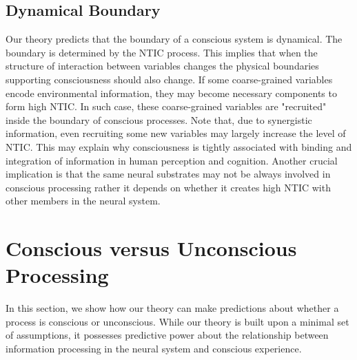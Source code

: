 \documentclass[utf8]{article}
\begin{document}
        
		\begin{figure}[H]
		
			\label{fig:hierarchy}
		\end{figure}


        \subsection{Dynamical Boundary}
        Our theory predicts that the boundary of a conscious system is dynamical. The boundary is determined by the NTIC process. This implies that when the structure of interaction between variables changes the physical boundaries supporting consciousness should also change. If some coarse-grained variables encode environmental information, they may become necessary components to form high NTIC. In such case, these coarse-grained variables are "recruited" inside the boundary of conscious processes. Note that, due to synergistic information, even recruiting some new variables may largely increase the level of NTIC. 
        This may explain why consciousness is tightly associated with binding and integration of information in human perception and cognition. Another crucial implication is that the same neural substrates may not be always involved in conscious processing rather it depends on whether it creates high NTIC with other members in the neural system. 
    
    
	\section{Conscious versus Unconscious Processing}\label{sec:Conscious versus Unconscious Processing}
	    In this section, we show how our theory can make predictions about whether a process is conscious or unconscious. While our theory is built upon a minimal set of assumptions, it possesses predictive power about the relationship between information processing in the neural system and conscious experience.
	    
\end{document}
